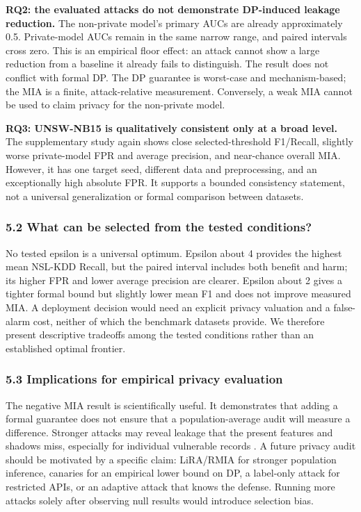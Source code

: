 \documentclass[11pt,a4paper]{article}
\begin{document}
\textbf{RQ2: the evaluated attacks do not demonstrate DP-induced leakage
reduction.} The non-private model's primary AUCs are already
approximately 0.5. Private-model AUCs remain in the same narrow range,
and paired intervals cross zero. This is an empirical floor effect: an
attack cannot show a large reduction from a baseline it already fails to
distinguish. The result does not conflict with formal DP. The DP
guarantee is worst-case and mechanism-based; the MIA is a finite,
attack-relative measurement. Conversely, a weak MIA cannot be used to
claim privacy for the non-private model.

\textbf{RQ3: UNSW-NB15 is qualitatively consistent only at a broad
level.} The supplementary study again shows close selected-threshold
F1/Recall, slightly worse private-model FPR and average precision, and
near-chance overall MIA. However, it has one target seed, different data
and preprocessing, and an exceptionally high absolute FPR. It supports a
bounded consistency statement, not a universal generalization or formal
comparison between datasets.

\hypertarget{what-can-be-selected-from-the-tested-conditions}{%
\subsubsection{5.2 What can be selected from the tested
conditions?}\label{what-can-be-selected-from-the-tested-conditions}}

No tested epsilon is a universal optimum. Epsilon about 4 provides the
highest mean NSL-KDD Recall, but the paired interval includes both
benefit and harm; its higher FPR and lower average precision are
clearer. Epsilon about 2 gives a tighter formal bound but slightly lower
mean F1 and does not improve measured MIA. A deployment decision would
need an explicit privacy valuation and a false-alarm cost, neither of
which the benchmark datasets provide. We therefore present descriptive
tradeoffs among the tested conditions rather than an established optimal
frontier.

\hypertarget{implications-for-empirical-privacy-evaluation}{%
\subsubsection{5.3 Implications for empirical privacy
evaluation}\label{implications-for-empirical-privacy-evaluation}}

The negative MIA result is scientifically useful. It demonstrates that
adding a formal guarantee does not ensure that a population-average
audit will measure a difference. Stronger attacks may reveal leakage
that the present features and shadows miss, especially for individual
vulnerable records \citep{carlini2022membership, aerni2024evaluations}.
A future privacy audit should be motivated by a specific claim:
LiRA/RMIA for stronger population inference, canaries for an empirical
lower bound on DP, a label-only attack for restricted APIs, or an
adaptive attack that knows the defense. Running more attacks solely
after observing null results would introduce selection bias.
\end{document}
